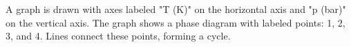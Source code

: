 A graph is drawn with axes labeled "T (K)" on the horizontal axis and "p (bar)" on the vertical axis. The graph shows a phase diagram with labeled points: 1, 2, 3, and 4. Lines connect these points, forming a cycle.